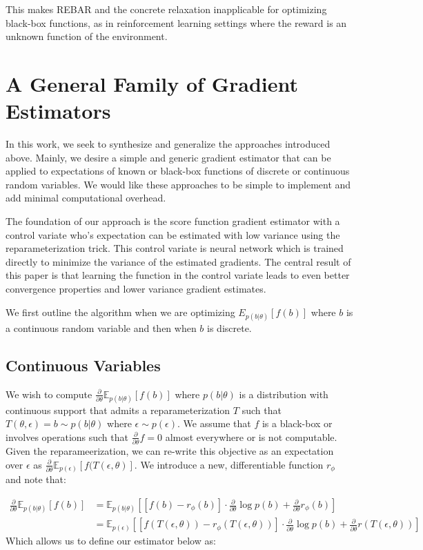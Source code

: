 \documentclass{article}
\newcommand{\E}{\mathbb{E}}
\newcommand{\PT}{\frac{\partial}{\partial \theta}}
\newcommand{\LP}[1]{\PT \log p(#1)}
\begin{document}
This makes REBAR and the concrete relaxation inapplicable for optimizing black-box functions, as in reinforcement learning settings where the reward is an unknown function of the environment.


\section{A General Family of Gradient Estimators}
In this work, we seek to synthesize and generalize the approaches introduced above. Mainly, we desire a simple and generic gradient estimator that can be applied to expectations of known or black-box functions of discrete or continuous random variables. We would like these approaches to be simple to implement and add minimal computational overhead. 

The foundation of our approach is the score function gradient estimator with a control variate who's expectation can be estimated with low variance using the reparameterization trick. This control variate is neural network which is trained directly to minimize the variance of the estimated gradients. The central result of this paper is that learning the function in the control variate leads to even better convergence properties and lower variance gradient estimates. 

We first outline the algorithm when we are optimizing $E_{p(b|\theta)}[f(b)]$ where $b$ is a continuous random variable and then when $b$ is discrete.

\subsection{Continuous Variables}
We wish to compute $\PT\E_{p(b|\theta)}[f(b)]$ where $p(b|\theta)$ is a distribution with continuous support that admits a reparameterization $T$ such that $T(\theta, \epsilon) = b \sim p(b|\theta)$ where $\epsilon \sim p(\epsilon)$. We assume that $f$ is a black-box or involves operations such that $\PT f = 0$ almost everywhere or is not computable.  Given the reparameerization, we can re-write this objective as an expectation over $\epsilon$ as  $\PT\E_{p(\epsilon)}[f(T(\epsilon, \theta)]$. We introduce a new, differentiable function $r_\phi$ and note that:

\begin{align}
\PT\E_{p(b|\theta)}[f(b)] &= \E_{p(b|\theta)}\left[ \left[f(b) - r_\phi(b)\right]\cdot\LP{b} + \PT r_\phi(b) \right]\nonumber\\
&= \E_{p(\epsilon)} \left[ \left[f(T(\epsilon, \theta)) - r_\phi(T(\epsilon, \theta))\right]\cdot\LP{b} + \PT r(T(\epsilon, \theta))\right]\nonumber
\end{align}
Which allows us to define our estimator below as: 
\end{document}
